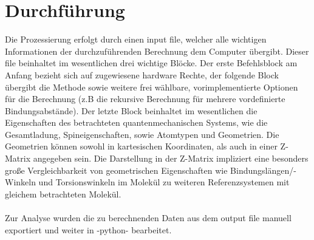 
 
%
\section{Durchführung}
Die Prozessierung erfolgt durch einen input file, welcher alle wichtigen Informationen der durchzuführenden Berechnung dem Computer übergibt. Dieser file beinhaltet im wesentlichen drei wichtige Blöcke. Der erste Befehlsblock am Anfang bezieht sich auf zugewiesene hardware Rechte, der folgende Block übergibt die Methode sowie weitere frei wählbare, vorimplementierte Optionen für die Berechnung (z.B die rekursive Berechnung für mehrere vordefinierte Bindungsabstände). Der letzte Block beinhaltet im wesentlichen die Eigenschaften des betrachteten quantenmechanischen Systems, wie die Gesamtladung, Spineigenschaften, sowie Atomtypen und Geometrien. Die Geometrien können sowohl in kartesischen Koordinaten, als auch in einer Z-Matrix angegeben sein. Die Darstellung in der Z-Matrix impliziert eine besonders große Vergleichbarkeit von geometrischen Eigenschaften wie Bindungslängen/- Winkeln und Torsionswinkeln im Molekül zu weiteren Referenzsystemen mit gleichem betrachteten Molekül.\\
\\
Zur Analyse wurden die zu berechnenden Daten aus dem output file manuell exportiert und weiter in -python- bearbeitet.

%